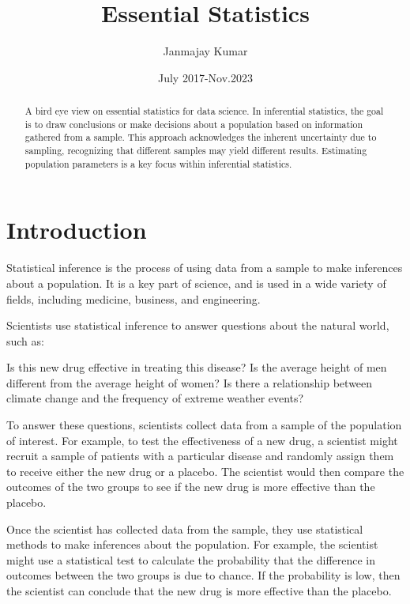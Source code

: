 \documentclass[12pt,a4paper]{article}
\title{Essential Statistics}
\author{Janmajay Kumar}
\date{July 2017-Nov.2023}
\theoremstyle{example}
\theoremstyle{definition}
\theoremstyle{theorem}
\begin{document}
\maketitle

\begin{abstract}
 A bird eye view on essential statistics for data science. In inferential statistics, the goal is to draw conclusions or make decisions about a population based on information gathered from a sample. This approach acknowledges the inherent uncertainty due to sampling, recognizing that different samples may yield different results. Estimating population parameters is a key focus within inferential statistics.

\end{abstract}

\section{Introduction}\label{sec:intro}

Statistical inference is the process of using data from a sample to make inferences about a population. It is a key part of science, and is used in a wide variety of fields, including medicine, business, and engineering.

Scientists use statistical inference to answer questions about the natural world, such as:

    Is this new drug effective in treating this disease?
    Is the average height of men different from the average height of women?
    Is there a relationship between climate change and the frequency of extreme weather events?

To answer these questions, scientists collect data from a sample of the population of interest. For example, to test the effectiveness of a new drug, a scientist might recruit a sample of patients with a particular disease and randomly assign them to receive either the new drug or a placebo. The scientist would then compare the outcomes of the two groups to see if the new drug is more effective than the placebo.

Once the scientist has collected data from the sample, they use statistical methods to make inferences about the population. For example, the scientist might use a statistical test to calculate the probability that the difference in outcomes between the two groups is due to chance. If the probability is low, then the scientist can conclude that the new drug is more effective than the placebo.
\end{document}
